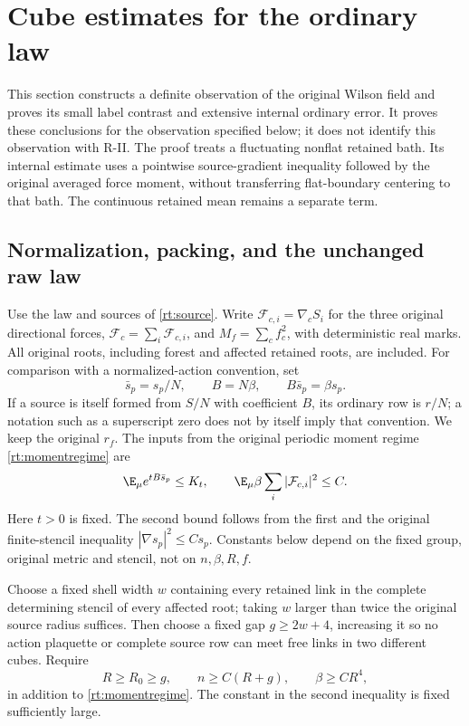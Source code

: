 \section{Cube estimates for the ordinary law}
\label{cb:section}
\label{cb:cubes}

This section constructs a definite observation of the original Wilson field and proves its small label contrast and extensive internal ordinary error. It proves these conclusions for the observation specified below; it does not identify this observation with R-II. The proof treats a fluctuating nonflat retained bath. Its internal estimate uses a pointwise source-gradient inequality followed by the original averaged force moment, without transferring flat-boundary centering to that bath. The continuous retained mean remains a separate term.

\subsection{Normalization, packing, and the unchanged raw law}

Use the law and sources of \eqref{rt:source}. Write \(\mathcal F_{c,i}=\nabla_c S_i\) for the three original directional forces, \(\mathcal F_c=\sum_i\mathcal F_{c,i}\), and \(M_f=\sum_cf_c^2\), with deterministic real marks. All original roots, including forest and affected retained roots, are included. For comparison with a normalized-action convention, set
\begin{equation}
 \bar s_p=s_p/N,\qquad B=N\beta,\qquad B\bar s_p=\beta s_p.
 \label{cb:normalization}
\end{equation}
If a source is itself formed from \(S/N\) with coefficient \(B\), its ordinary row is \(r/N\); a notation such as a superscript zero does not by itself imply that convention. We keep the original \(r_f\). The inputs from the original periodic moment regime \eqref{rt:momentregime} are
\begin{equation}
 \E_\mu e^{tB\bar s_p}\le K_t,\qquad
 \E_\mu\beta\sum_i|\mathcal F_{c,i}|^2\le C.
 \label{cb:moments}
\end{equation}
Here \(t>0\) is fixed. The second bound follows from the first and the original finite-stencil inequality \(|\nabla s_p|^2\le Cs_p\). Constants below depend on the fixed group, original metric and stencil, not on \(n,\beta,R,f\).

Choose a fixed shell width \(w\) containing every retained link in the complete determining stencil of every affected root; taking \(w\) larger than twice the original source radius suffices. Then choose a fixed gap \(g\ge2w+4\), increasing it so no action plaquette or complete source row can meet free links in two different cubes. Require
\begin{equation}
 R\ge R_0\ge g,\qquad n\ge C(R+g),\qquad \beta\ge CR^4,
 \label{cb:geometryregime}
\end{equation}
in addition to \eqref{rt:momentregime}. The constant in the second inequality is fixed sufficiently large.

